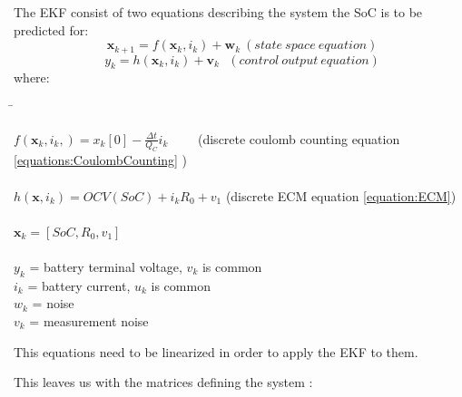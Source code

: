 The EKF consist of two equations describing the system the SoC is to be predicted for:
\begin{equation}
  {\boldsymbol {x}}_{k+1}=f({\boldsymbol {x}}_{k},{{i}}_{k})+ {\boldsymbol {w}}_{k}  \ (state\ space\ equation)  %
\end{equation}
\begin{equation}
 y_{k}=h({\boldsymbol  {x}}_{{k}}, {i}_{k})+{\boldsymbol  {v}}_{{k}}  \ \ \  (control\ output\ equation ) %
\end{equation}
where: 
\begin{tabbing}
\phantom{$v(t)  \  \ \ \  \ $}\= \kill

$f({\boldsymbol {x}}_{k}, {i}_{k},) = {x}_{k}[0] - \frac{\Delta t}{Q_{C}} i_{k} $ \ \ \ \ (discrete coulomb counting equation \ref{equations:CoulombCounting} ) \\\\
$h(\boldsymbol x,i_k) = OCV(SoC) + i_k R_0  +  v_1$ (discrete ECM equation \ref{equation:ECM})\\\\
$\boldsymbol x_{k} = [SoC, R_0, v_1]$ \\\\
$y_{k}$\> =  battery terminal voltage,  $v_{k}$ is common  \\
$i_{k}$\> =   battery current, $u_{k}$ is common  \\
$w_{k}$\> = noise    \\ 
$v_{k}$\> = measurement noise    \\
\end{tabbing}	


This equations need to be linearized in order to apply the EKF to them. 

This leaves us with the matrices defining the system : 

